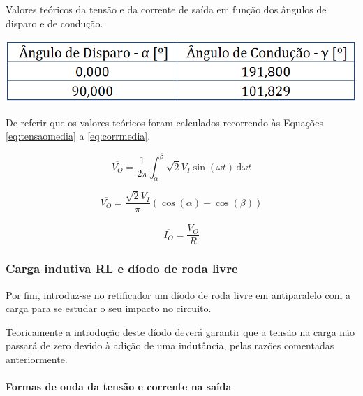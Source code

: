 \documentclass[a4paper,11pt]{article}
\numberwithin{equation}{section}
\begin{document}
\begin{table}[!htb]
	\centering
	\caption{Valores teóricos da tensão e da corrente de saída em função dos ângulos de disparo e de condução.}
	\vspace{-3mm}
	\includegraphics[width=0.5\linewidth]{teoricas/tabela2}
	\label{tab:tabela3}
\end{table}

De referir que os valores teóricos foram calculados recorrendo às Equações \ref{eq:tensaomedia} a \ref{eq:corrmedia}.

\begin{equation}
\label{eq:tensaomedia}
\overline{V_O} = \frac{1}{2\pi}\int_\alpha^\beta  \sqrt{2} V_I \sin(\omega t)\,\mathrm{d}\omega t
\end{equation}

\begin{equation}
\overline{V_O} = \frac{\sqrt{2}V_I}{\pi} (\cos(\alpha)-\cos(\beta))
\end{equation}

\begin{equation}
\label{eq:corrmedia}
\overline{I_O} = \frac{\overline{V_O}}{R}
\end{equation}


\subsubsection{Carga indutiva RL e díodo de roda livre}

Por fim, introduz-se no retificador um díodo de roda livre em antiparalelo com a carga para se estudar o seu impacto no circuito.

Teoricamente a introdução deste díodo deverá garantir que a tensão na carga não passará de zero devido à adição de uma indutância, pelas razões comentadas anteriormente.


\paragraph{Formas de onda da tensão e corrente na saída \label{parag:1}}\mbox{}\
\end{document}
